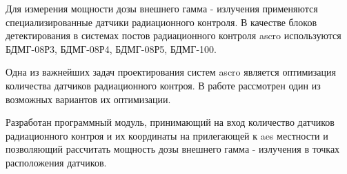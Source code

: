 Для измерения мощности дозы внешнего гамма - излучения применяются специализированные датчики радиационного контроля. 
В качестве блоков детектирования в системах постов радиационного контроля \ac{ascro} используются БДМГ-08Р3, 
БДМГ-08Р4, БДМГ-08Р5, БДМГ-100.

Одна из важнейших задач проектирования систем \ac{ascro} является оптимизация количества датчиков радиационного контроя. 
В работе рассмотрен один из возможных вариантов их оптимизации.

Разработан программный модуль, принимающий на вход количество датчиков радиационного контроя и их координаты на 
прилегающей к \ac{aes} местности и позволяющий рассчитать мощность дозы внешнего гамма - излучения в точках расположения 
датчиков.